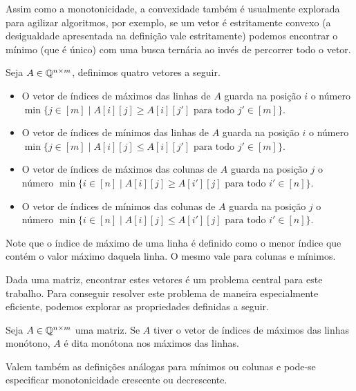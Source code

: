 Assim como a monotonicidade, a convexidade também é usualmente explorada para agilizar algoritmos, por exemplo, se um vetor é estritamente convexo (a desigualdade apresentada na definição vale estritamente) podemos encontrar o mínimo (que é único) com uma busca ternária ao invés de percorrer todo o vetor.  

\begin{defi}
Seja $A \in \mathbb{Q}^{n \times m}$, definimos quatro vetores a seguir.
    \begin{itemize}
        \item O vetor de índices de máximos das linhas de $A$ guarda na posição $i$ 
              o número $\min\{j \in [m] \mid A[i][j] \geq A[i][j'] \text{ para todo } j' \in [m]\}$. 
        \item O vetor de índices de mínimos das linhas de $A$ guarda na posição $i$ 
              o número $\min\{j \in [m] \mid A[i][j] \leq A[i][j'] \text{ para todo } j' \in [m]\}$. 
        \item O vetor de índices de máximos das colunas de $A$ guarda na posição $j$ 
              o número $\min\{i \in [n] \mid A[i][j] \geq A[i'][j] \text{ para todo } i' \in [n]\}$. 
        \item O vetor de índices de mínimos das colunas de $A$ guarda na posição $j$ 
              o número $\min\{i \in [n] \mid A[i][j] \leq A[i'][j] \text{ para todo } i' \in [n]\}$. 
    \end{itemize}

Note que o índice de máximo de uma linha é definido como o menor índice que contém o valor máximo daquela linha. O mesmo vale para colunas e mínimos.
\end{defi}

Dada uma matriz, encontrar estes vetores é um problema central para este trabalho. Para conseguir resolver este problema de maneira especialmente eficiente, podemos explorar as propriedades definidas a seguir.

\begin{defi}
Seja $A \in \mathbb{Q}^{n \times m}$ uma matriz. Se $A$ tiver o vetor de índices de máximos das linhas monótono, $A$ é dita monótona nos máximos das linhas. 

Valem também as definições análogas para mínimos ou colunas e pode-se especificar monotonicidade crescente ou decrescente.
\end{defi}

